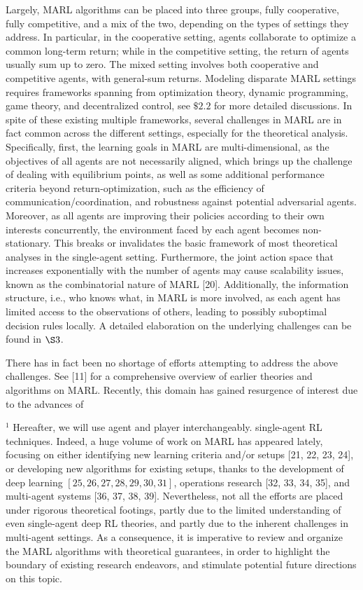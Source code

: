 \documentclass[10pt]{article}
\begin{document}
Largely, MARL algorithms can be placed into three groups, fully cooperative, fully competitive, and a mix of the two, depending on the types of settings they address. In particular, in the cooperative setting, agents collaborate to optimize a common long-term return; while in the competitive setting, the return of agents usually sum up to zero. The mixed setting involves both cooperative and competitive agents, with general-sum returns. Modeling disparate MARL settings requires frameworks spanning from optimization theory, dynamic programming, game theory, and decentralized control, see $\$ 2.2$ for more detailed discussions. In spite of these existing multiple frameworks, several challenges in MARL are in fact common across the different settings, especially for the theoretical analysis. Specifically, first, the learning goals in MARL are multi-dimensional, as the objectives of all agents are not necessarily aligned, which brings up the challenge of dealing with equilibrium points, as well as some additional performance criteria beyond return-optimization, such as the efficiency of communication/coordination, and robustness against potential adversarial agents. Moreover, as all agents are improving their policies according to their own interests concurrently, the environment faced by each agent becomes non-stationary. This breaks or invalidates the basic framework of most theoretical analyses in the single-agent setting. Furthermore, the joint action space that increases exponentially with the number of agents may cause scalability issues, known as the combinatorial nature of MARL [20]. Additionally, the information structure, i.e., who knows what, in MARL is more involved, as each agent has limited access to the observations of others, leading to possibly suboptimal decision rules locally. A detailed elaboration on the underlying challenges can be found in $\S 3$.

There has in fact been no shortage of efforts attempting to address the above challenges. See [11] for a comprehensive overview of earlier theories and algorithms on MARL. Recently, this domain has gained resurgence of interest due to the advances of

${ }^{1}$ Hereafter, we will use agent and player interchangeably. single-agent RL techniques. Indeed, a huge volume of work on MARL has appeared lately, focusing on either identifying new learning criteria and/or setups [21, 22, 23, 24], or developing new algorithms for existing setups, thanks to the development of deep learning $[25,26,27,28,29,30,31]$, operations research [32, 33, 34, 35], and multi-agent systems [36, 37, 38, 39]. Nevertheless, not all the efforts are placed under rigorous theoretical footings, partly due to the limited understanding of even single-agent deep RL theories, and partly due to the inherent challenges in multi-agent settings. As a consequence, it is imperative to review and organize the MARL algorithms with theoretical guarantees, in order to highlight the boundary of existing research endeavors, and stimulate potential future directions on this topic.
\end{document}
